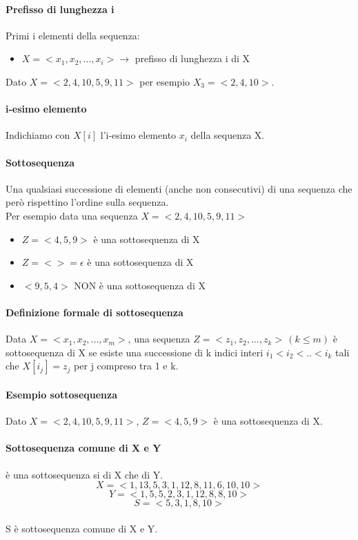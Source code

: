 \paragraph*{Prefisso di lunghezza i} Primi i elementi della sequenza:
\begin{itemize}
    \item $X=<x_1, x_2, ..., x_i> \rightarrow$ prefisso di lunghezza i di X
\end{itemize}
Dato $X=<2,4,10,5,9,11>$ per esempio $X_3=<2,4,10>$.
\paragraph*{i-esimo elemento} Indichiamo con $X[i]$ l'i-esimo elemento $x_i$ della sequenza X.
\paragraph*{Sottosequenza} Una qualsiasi successione di elementi (anche non consecutivi)
di una sequenza che però rispettino l'ordine sulla sequenza.\\
Per esempio data una sequenza $X=<2,4,10,5,9,11>$ 
\begin{itemize}
    \item $Z=<4,5,9>$ è una sottosequenza di X
    \item $Z=<>=\epsilon$ è una sottosequenza di X
    \item $<9, 5, 4>$ NON è una sottosequenza di X
\end{itemize}
\paragraph*{Definizione formale di sottosequenza}
Data $X = <x_1, x_2, ..., x_m>$, una sequenza $Z=<z_1, z_2, ..., z_k>\, (k \leq m)$ è
sottosequenza di X se esiste una successione di k indici interi $i_1 < i_2 < .. < i_k$ tali che
$X[i_j] = z_j$ per j compreso tra 1 e k.
\paragraph*{Esempio sottosequenza} Dato $X=<2,4,10,5,9,11>$, $Z=<4,5,9>$ è una sottosequenza di X.
\paragraph*{Sottosequenza comune di X e Y} è una sottosequenza si di X che di Y.
\[X = <1, 13, 5, 3, 1, 12, 8, 11, 6, 10, 10>\]
\[Y = <1, 5, 5, 2, 3, 1, 12, 8, 8, 10>\]
\[S = <5, 3, 1, 8, 10>\]\\
S è sottosequenza comune di X e Y.
